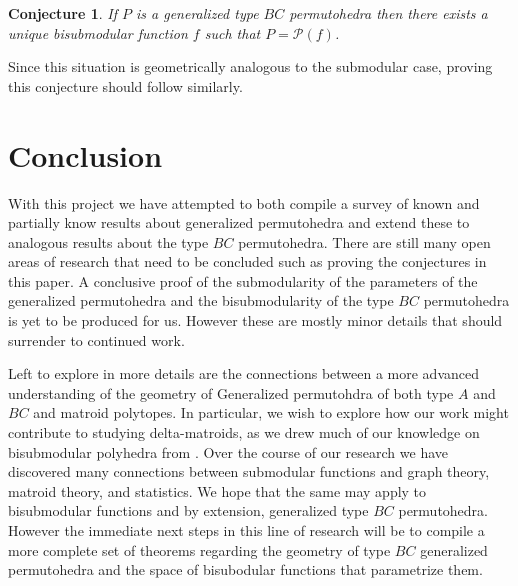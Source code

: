 \documentclass[12pt]{amsart}
\newtheorem{conj}[lemma]{Conjecture}
\numberwithin{equation}{section}
\newcommand{\pp}{\mathcal{P}}
\begin{document}
\begin{conj}
If $P$ is a generalized type $BC$ permutohedra then there exists a unique bisubmodular function $f$ such 
that $P= \pp(f)$. 
\end{conj}

Since this situation is geometrically analogous to the submodular case, proving this conjecture
should follow similarly.  


\section{Conclusion}

With this project we have attempted to both compile a survey of known and partially know
results about generalized permutohedra and extend these to analogous results about 
the type $BC$ permutohedra.  There are still many open areas of research that need to 
be concluded such as  proving the conjectures in this paper.   A conclusive proof
of the submodularity of the parameters of the generalized permutohedra and
the bisubmodularity of the type $BC$ permutohedra is yet to be produced for us. 
However these are mostly minor details that should surrender to continued work. 

Left to explore in more details are the connections between a more advanced understanding
of the geometry of Generalized permutohdra of both type $A$ and $BC$ and matroid
polytopes.   In particular, we wish to explore how our work might contribute to studying
delta-matroids, as we drew much of our knowledge on bisubmodular polyhedra from
\cite{Bisub}.  Over the course of our research we have discovered many connections
between submodular functions and graph theory, matroid theory, and statistics.  We hope
that the same may apply to bisubmodular functions and by extension, generalized 
type $BC$ permutohedra.   
However the immediate next steps in this line of research will be to compile a more
complete set of theorems regarding the geometry of type $BC$ generalized 
permutohedra and the space of bisubodular functions that parametrize them.   
\end{document}
